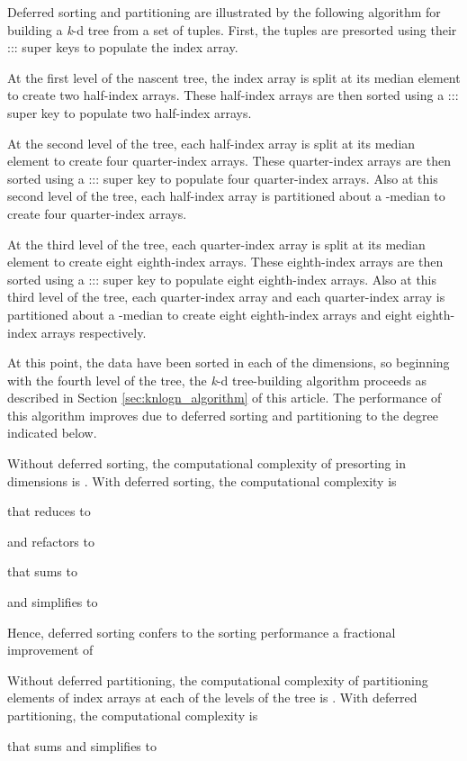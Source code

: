 \documentclass{sig-alternate}
\begin{document}
Deferred sorting and partitioning are illustrated by the following algorithm for building a \emph{k}-d tree from a set of  tuples.  First, the tuples are presorted using their ::: super keys to populate the  index array.

At the first level of the nascent tree, the  index array is split at its median element to create two half-index arrays. These half-index arrays are then sorted using a ::: super key to populate two  half-index arrays.

At the second level of the tree, each  half-index array is split at its median element to create four quarter-index arrays. These quarter-index arrays are then sorted using a ::: super key to populate four  quarter-index arrays.  Also at this second level of the tree, each  half-index array is partitioned about a -median to create four  quarter-index arrays.

At the third level of the tree, each  quarter-index array is split at its median element to create eight eighth-index arrays. These eighth-index arrays are then sorted using a ::: super key to populate eight  eighth-index arrays.  Also at this third level of the tree, each  quarter-index array and each  quarter-index array is partitioned about a -median to create eight  eighth-index arrays and eight  eighth-index arrays respectively.

At this point, the data have been sorted in each of the  dimensions, so beginning with the fourth level of the tree, the  \emph{k}-d tree-building algorithm proceeds as described in Section \ref{sec:knlogn_algorithm} of this article. The performance of this algorithm improves due to deferred sorting and partitioning to the degree indicated below.

Without deferred sorting, the computational complexity of presorting in  dimensions is . With deferred sorting, the computational complexity is

that reduces to

and refactors to

that sums to

and simplifies to

Hence, deferred sorting confers to the sorting performance a fractional improvement of


Without deferred partitioning, the computational complexity of partitioning  elements of  index arrays at each of the  levels of the tree is . With deferred partitioning, the computational complexity is

that sums and simplifies to
\end{document}
